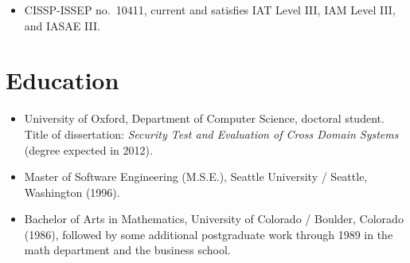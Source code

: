 \documentclass[letterpaper]{article}
\begin{document}
\begin{itemize}
	\item CISSP-ISSEP no.\ 10411, current and satisfies IAT Level III, IAM Level III,
		and IASAE III.
\end{itemize}

\section*{Education}

\begin{itemize}
    \item University of Oxford, Department of Computer Science,
		doctoral student.  Title of dissertation: \emph{Security Test and Evaluation
		of Cross Domain Systems} (degree expected in 2012).

    \item Master of Software Engineering (M.S.E.), Seattle
		University / Seattle, Washington (1996).

    \item Bachelor of Arts in Mathematics, University of
		Colorado / Boulder, Colorado (1986), followed by some additional
		postgraduate work through 1989 in the math department and the business school.
\end{itemize}
\end{document}

